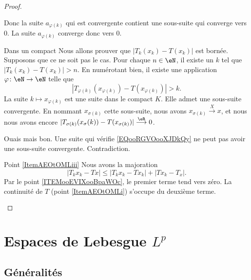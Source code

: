 \begin{proof}
\begin{subproof}
\begin{subproof}
        Donc la suite \( a_{\varphi(k)}\) qui est convergente contient une sous-suite qui converge vers \( 0\). La suite \( a_{\varphi(k)}\) converge donc vers \( 0\).
    \item[Dans un compact]
        Nous allons prouver que \( | T_k(x_k)-T(x_k) |\) est bornée. Supposons que ce ne soit pas le cas. Pour chaque \( n\in \eN\), il existe un \( k\) tel que \( | T_k(x_k)-T(x_k) |>n\). En numérotant bien, il existe une application \( \varphi\colon \eN\to \eN\) telle que 
        \begin{equation}        \label{EQooRGVOooXJDkQy}
            | T_{\varphi(k)}(x_{\varphi(k)})-T(x_{\varphi(k)}) |>k.
        \end{equation}
        La suite \( k\mapsto x_{\varphi(k)}\) est une suite dans le compact \( K\). Elle admet une sous-suite convergente. En nommant \( x_{\sigma(k)}\) cette sous-suite, nous avons \( x_{\sigma(k)}\stackrel{X}{\longrightarrow}x\), et nous nous avons encore \( | T_{\sigma(k)}(x_{\sigma}(k))-T(x_{\sigma(k)}) |\stackrel{\eR}{\longrightarrow}0\).

        Ouais mais bon. Une suite qui vérifie \eqref{EQooRGVOooXJDkQy} ne peut pas avoir une sous-suite convergente. Contradiction.
    \end{subproof}
\item[Point \ref{ItemAEOtOMLiii}]
    Nous avons la majoration
    \begin{equation}
        | T_kx_k-Tx |\leq | T_kx_k-Tx_k |+| Tx_k-T_x |.
    \end{equation}
    Par le point \ref{ITEMooEVIXooBpaWOc}, le premier terme tend vers zéro. La continuité de \( T\) (point \ref{ItemAEOtOMLi}) s'occupe du deuxième terme.
    \end{subproof}
\end{proof}




\section{Espaces de Lebesgue \texorpdfstring{$L^p$}{Lp}}
\label{SecVKiVIQK}

\subsection{Généralités}

